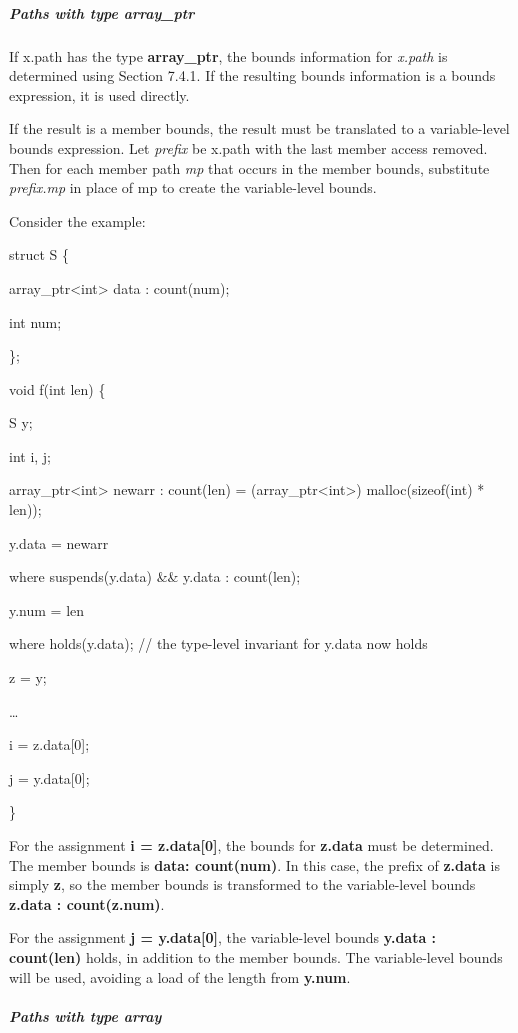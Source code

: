 \documentclass[]{article}
\let\oldsubparagraph\subparagraph
\renewcommand{\subparagraph}[1]{\oldsubparagraph{#1}\mbox{}}
\begin{document}
\subparagraph{Paths with type
array\_ptr}\label{paths-with-type-arrayux5fptr}

If x.path has the type \textbf{array\_ptr}, the bounds information for
\emph{x.path} is determined using Section 7.4.1. If the resulting bounds
information is a bounds expression, it is used directly.

If the result is a member bounds, the result must be translated to a
variable-level bounds expression. Let \emph{prefix} be x.path with the
last member access removed. Then for each member path \emph{mp} that
occurs in the member bounds, substitute \emph{prefix.mp} in place of mp
to create the variable-level bounds.

Consider the example:

struct S \{

array\_ptr\textless{}int\textgreater{} data : count(num);

int num;

\};

void f(int len) \{

S y;

int i, j;

array\_ptr\textless{}int\textgreater{} newarr : count(len) =
(array\_ptr\textless{}int\textgreater{}) malloc(sizeof(int) * len));

y.data = newarr

where suspends(y.data) \&\& y.data : count(len);

y.num = len

where holds(y.data); // the type-level invariant for y.data now holds

z = y;

\ldots{}

i = z.data{[}0{]};

j = y.data{[}0{]};

\}

For the assignment \textbf{i = z.data{[}0{]}}, the bounds for
\textbf{z.data} must be determined. The member bounds is \textbf{data:
count(num)}. In this case, the prefix of \textbf{z.data} is simply
\textbf{z}, so the member bounds is transformed to the variable-level
bounds \textbf{z.data : count(z.num)}.

For the assignment \textbf{j = y.data{[}0{]}}, the variable-level bounds
\textbf{y.data : count(len)} holds, in addition to the member bounds.
The variable-level bounds will be used, avoiding a load of the length
from \textbf{y.num}.

\subparagraph{Paths with type array}\label{paths-with-type-array}
\end{document}
